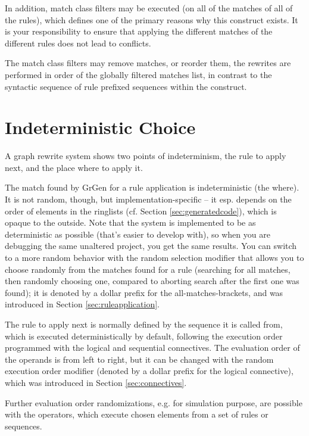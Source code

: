 In addition, match class filters may be executed (on all of the matches of all of the rules), which defines one of the primary reasons why this construct exists.
It is your responsibility to ensure that applying the different matches of the different rules does not lead to conflicts.

The match class filters may remove matches, or reorder them, the rewrites are performed in order of the globally filtered matches list, in contrast to the syntactic sequence of rule prefixed sequences within the construct.


\section{Indeterministic Choice}\label{sec:indetchoice}

A graph rewrite system shows two points of indeterminism, the rule to apply next, and the place where to apply it.

The match found by GrGen for a rule application is indeterministic (the where).
It is not random, though, but implementation-specific -- it esp. depends on the order of elements in the ringlists (cf. Section \ref{sec:generatedcode}), which is opaque to the outside.
Note that the system is implemented to be as deterministic as possible (that's easier to develop with), so when you are debugging the same unaltered project, you get the same results.
You can switch to a more random behavior with the random selection modifier that allows you to choose randomly from the matches found for a rule (searching for all matches, then randomly choosing one, compared to aborting search after the first one was found); it is denoted by a dollar prefix for the all-matches-brackets, and was introduced in Section \ref{sec:ruleapplication}.

The rule to apply next is normally defined by the sequence it is called from, which is executed deterministically by default, following the execution order programmed with the logical and sequential connectives.
The evaluation order of the operands is from left to right, but it can be changed with the random execution order modifier (denoted by a dollar prefix for the logical connective), which was introduced in Section \ref{sec:connectives}.

Further evaluation order randomizations, e.g. for simulation purpose, are possible with the  operators, which execute chosen elements from a set of rules or sequences.

